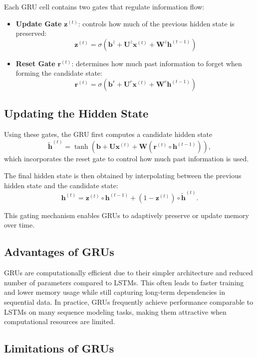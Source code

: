 \documentclass{article}
\begin{document}
Each GRU cell contains two gates that regulate information flow:

\begin{itemize}
    \item \textbf{Update Gate} \( \mathbf{z}^{(t)} \): controls how much of the previous hidden state is preserved:
    \[
    \mathbf{z}^{(t)}=\sigma(\mathbf{b}^z+\mathbf{U}^z\mathbf{x}^{(t)}+\mathbf{W}^z\mathbf{h}^{(t-1)})
    \]

    \item \textbf{Reset Gate} \( \mathbf{r}^{(t)} \): determines how much past information to forget when forming the candidate state:
    \[
    \mathbf{r}^{(t)}=\sigma(\mathbf{b}^r+\mathbf{U}^r\mathbf{x}^{(t)}+\mathbf{W}^r\mathbf{h}^{(t-1)})
    \]
\end{itemize}

\subsection{Updating the Hidden State}

Using these gates, the GRU first computes a candidate hidden state
\[
\tilde{\mathbf{h}}^{(t)}=\tanh\!\left(\mathbf{b}+\mathbf{U}\mathbf{x}^{(t)}+\mathbf{W}(\mathbf{r}^{(t)}\circ\mathbf{h}^{(t-1)})\right),
\]
which incorporates the reset gate to control how much past information is used.

The final hidden state is then obtained by interpolating between the previous hidden state and the candidate state:
\[
\mathbf{h}^{(t)}=\mathbf{z}^{(t)}\circ\mathbf{h}^{(t-1)}+(1-\mathbf{z}^{(t)})\circ\tilde{\mathbf{h}}^{(t)}.
\]

This gating mechanism enables GRUs to adaptively preserve or update memory over time.

\subsection{Advantages of GRUs}

GRUs are computationally efficient due to their simpler architecture and reduced number of parameters compared to LSTMs. This often leads to faster training and lower memory usage while still capturing long-term dependencies in sequential data. In practice, GRUs frequently achieve performance comparable to LSTMs on many sequence modeling tasks, making them attractive when computational resources are limited.

\subsection{Limitations of GRUs}
\end{document}
